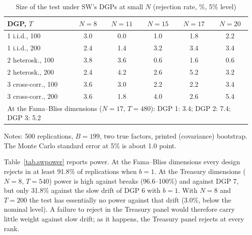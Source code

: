 \documentclass[11pt]{article}
\begin{document}
\begin{table}[htbp]
\centering
\begin{threeparttable}
\caption{Size of the test under SW's DGPs at small $N$ (rejection rate, \%, 5\% level)}\label{tab.swsize}
\begin{tabular}{lccccc}
\toprule
DGP, $T$ & $N=8$ & $N=11$ & $N=15$ & $N=17$ & $N=20$\\
\midrule
1 i.i.d., 100 & 3.0 & 0.0 & 1.0 & 1.8 & 2.2\\
1 i.i.d., 200 & 2.4 & 1.4 & 3.2 & 3.4 & 3.4\\
2 heterosk., 100 & 3.8 & 3.6 & 0.6 & 1.6 & 0.6\\
2 heterosk., 200 & 2.4 & 4.2 & 2.6 & 5.2 & 3.2\\
3 cross-corr., 100 & 3.6 & 3.0 & 2.2 & 2.2 & 3.4\\
3 cross-corr., 200 & 3.6 & 1.8 & 4.0 & 2.6 & 5.4\\
\midrule
\multicolumn{6}{l}{At the Fama--Bliss dimensions ($N=17$, $T=480$): DGP 1: 3.4; DGP 2: 7.4; DGP 3: 5.2}\\
\bottomrule
\end{tabular}
\begin{tablenotes}\small
\item Notes: 500 replications, $B=199$, two true factors, printed (covariance) bootstrap. The Monte Carlo standard error at 5\% is about 1.0 point.
\end{tablenotes}
\end{threeparttable}
\end{table}

Table~\ref{tab.swpower} reports power. At the Fama--Bliss dimensions every design rejects in at least 91.8\% of replications when $b=1$. At the Treasury dimensions ($N=8$, $T=540$) power is high against breaks (96.6--100\%) and against DGP 7, but only 31.8\% against the slow drift of DGP 6 with $b=1$. With $N=8$ and $T=200$ the test has essentially no power against that drift (3.0\%, below the nominal level). A failure to reject in the Treasury panel would therefore carry little weight against slow drift; as it happens, the Treasury panel rejects at every rank.
\end{document}
